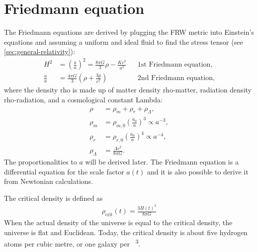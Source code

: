 \section{Friedmann equation}
\label{sec:Friedmann}

The Friedmann equations are derived by plugging the FRW metric into Einstein's equations and assuming a uniform and ideal fluid to find the stress tensor (see \cref{sec:general-relativity}):
\begin{align*}
	H^2 &= \left( \frac{\dot{a}}{a} \right)^2 = \frac{8 \pi G}{3} \rho - \frac{K c^2}{a^2} && \text{1st Friedmann equation,}\\
	\frac{\ddot{a}}{a} &= \frac{4 \pi G}{3} \left( \rho + \frac{3 p}{c^2} \right) && \text{2nd Friedmann equation,}
\end{align*}
where the density \gls{rho} is made up of matter density \gls{rho-matter}, radiation density \gls{rho-radiation}, and a cosmological constant \gls{Lambda}:
\begin{align*}
	\rho &= \rho_m + \rho_r + \rho_{\Lambda},\\
	\rho_m &= \rho_{m,0} \left( \frac{a_0}{a} \right)^3 \propto a^{-3},\\
	\rho_r &= \rho_{r,0} \left( \frac{a_0}{a} \right)^4 \propto a^{-4},\\
	\rho_{\Lambda} &= \frac{\Lambda c^2}{8 \pi G}.
\end{align*}
The proportionalities to $a$ will be derived later.
The Friedmann equation is a differential equation for the scale factor $a(t)$ and it is also possible to derive it from Newtonian calculations.

The critical density is defined as
\begin{align*}
	\rho_\text{crit}(t) = \frac{3 H(t)^2}{8 \pi G}
\end{align*}
When the actual density of the universe is equal to the critical density, the universe is flat and Euclidean.
Today, the critical density is about five hydrogen atoms per cubic metre, or one galaxy per \si{\mega\parsec\cubed}.

